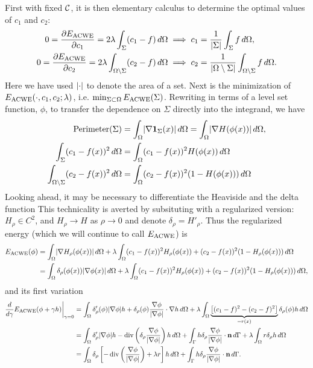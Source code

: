 First with fixed $\mathcal{C}$, it is then elementary calculus to determine the optimal values of $c_1$ and $c_2$: 
\begin{align}
0 = \frac{\partial E_\textrm{ACWE}}{\partial c_1}  = 2\lambda \int_{\Sigma} (c_1 - f ) \,d\Omega
&\implies 
c_1 = \frac{1}{\lvert\Sigma\rvert} \int_{\Sigma} f \,d\Omega,
\label{eq:c1}
\\
0 = \frac{\partial E_\textrm{ACWE}}{\partial c_2}  = 2\lambda \int_{\Omega\setminus \Sigma} (c_2 - f )\,d\Omega
&\implies 
c_2 = \frac{1}{\lvert\Omega\setminus\Sigma\rvert} \int_{\Omega\setminus \Sigma} f \,d\Omega.
\label{eq:c2}
\end{align}
Here we have used $\lvert\cdot\rvert$ to denote the area of a set. Next is the minimization of $E_\textrm{ACWE}(\cdot, c_1, c_2; \lambda)$, i.e. $\min_{\Sigma \subset \Omega} E_\textrm{ACWE}(\Sigma)$. Rewriting in terms of a level set function, $\phi$, to transfer the dependence on $\Sigma$ directly into the integrand, we have 
\begin{align}
\textrm{Perimeter}(\Sigma) 
&= \int_{\Omega} \lvert\nabla \mathbf{1}_\Sigma(x)\rvert \,d\Omega
= \int_{\Omega} \lvert \nabla H(\phi(x)) \rvert \,d\Omega,
\label{eacwe1}
\\
\int_{\Sigma} (c_1 - f(x) )^2 \, d\Omega 
&= \int_{\Omega} (c_1 - f(x))^2 H(\phi(x)) \, d\Omega
\\
\int_{\Omega\setminus\Sigma} (c_2 - f(x))^2 \,d\Omega 
&=
\int_{\Omega} (c_2 - f(x))^2 (1 - H(\phi(x))) \,d\Omega
\end{align}
Looking ahead, it may be necessary to differentiate the Heaviside and the delta function This technicality is averted by subsituting with a regularized version: $H_\rho \in C^2$, and $H_\rho \rightarrow H$ as $\rho\rightarrow 0$ and denote $\delta_\rho = H'_\rho$. Thus the regularized energy (which we will continue to call $E_\textrm{ACWE}$) is
\begin{align*}
E_\textrm{ACWE}(\phi) 
&= \int_{\Omega } \lvert\nabla H_\rho(\phi(x))\rvert \,d\Omega 
+ \lambda\int_{\Omega} (c_1 - f(x))^2 H_\rho(\phi(x)) 
+ (c_2 - f(x))^2 (1 - H_\rho(\phi(x))) \,d\Omega
\\
&= \int_{\Omega } \delta_\rho(\phi(x)) \lvert\nabla \phi(x)\rvert \,d\Omega 
+ \lambda\int_{\Omega} (c_1 - f(x))^2 H_\rho(\phi(x)) 
+ (c_2 - f(x))^2 (1 - H_\rho(\phi(x))) \,d\Omega,
\end{align*}
and its first variation
\begin{align*}
\frac{d}{d\gamma}E_\textrm{ACWE}(\phi + \gamma h) \bigg\rvert_{\gamma = 0}
&= \int_{\Omega} \delta'_\rho(\phi) \lvert\nabla \phi\rvert h + \delta_\rho(\phi) \frac{\nabla \phi}{\lvert\nabla \phi\rvert} \cdot \nabla h \,d\Omega
+ \lambda\int_{\Omega} \underbrace{\left[(c_1 - f)^2 - (c_2 - f)^2 \right]}_{=r(x)} \delta_\rho(\phi) h \,d\Omega 
\\
&= \int_{\Omega } \delta'_\rho \lvert\nabla \phi\rvert h
- \operatorname{div}\left(\delta_\rho\frac{\nabla \phi}{\lvert\nabla \phi\rvert}  \right)  h
\,d\Omega 
+ \int_\Gamma h\delta_\rho\frac{\nabla \phi}{\lvert\nabla \phi\rvert} \cdot \mathbf{n} \,d\Gamma 
+ \lambda\int_{\Omega} r \delta_\rho h \,d\Omega
\\
&= \int_{\Omega} \delta_\rho\left[ 
- \operatorname{div}\left(\frac{\nabla \phi}{\lvert\nabla \phi\rvert} \right) + \lambda r
\right] h\,d\Omega 
+ \int_\Gamma h\delta_\rho\frac{\nabla \phi}{\lvert\nabla \phi\rvert} \cdot \mathbf{n} \,d\Gamma. 
\end{align*}
